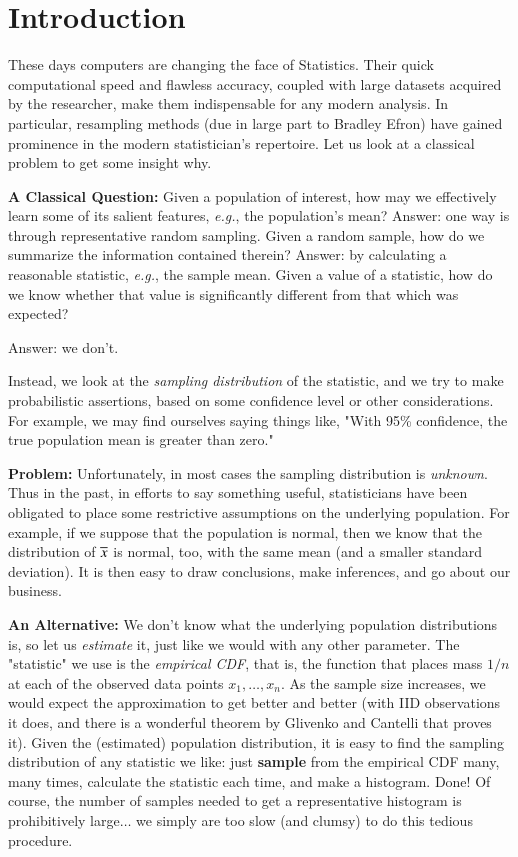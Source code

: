\documentclass[11pt,english]{scrbook}
\begin{document}
\section{Introduction}
\label{sec:orgf839db5}

These days computers are changing the face of Statistics. Their quick computational speed and flawless accuracy, coupled with large datasets acquired by the researcher, make them indispensable for any modern analysis. In particular, resampling methods (due in large part to Bradley Efron) have gained prominence in the modern statistician's repertoire. Let us look at a classical problem to get some insight
why.

\textbf{A Classical Question:} Given a population of interest, how may we effectively learn some of its salient features, \emph{e.g.}, the population's mean? Answer: one way is through representative random sampling. Given a random sample, how do we summarize the information contained therein? Answer: by calculating a reasonable statistic, \emph{e.g.}, the sample mean. Given a value of a statistic, how do we know whether that value is significantly different from that which was expected?

\begin{center}
Answer: we don't. 
\end{center}

Instead, we look at the \emph{sampling distribution} of the statistic, and we try to make probabilistic assertions, based on some confidence level or other considerations. For example, we may find ourselves saying things like, "With 95\% confidence, the true population mean is greater than zero."

\textbf{Problem:} Unfortunately, in most cases the sampling distribution is \emph{unknown}. Thus in the past, in efforts to say something useful, statisticians have been obligated to place some restrictive assumptions on the underlying population. For example, if we suppose that the population is normal, then we know that the distribution of \(\overline{x}\) is normal, too, with the same mean (and a smaller standard deviation). It is then easy to draw conclusions, make inferences, and go about our business.

\textbf{An Alternative:} We don't know what the underlying population distributions is, so let us \emph{estimate} it, just like we would with any other parameter. The "statistic" we use is the \emph{empirical CDF}, that is, the function that places mass \(1/n\) at each of the observed data points \(x_{1},\ldots,x_{n}\). As the sample size increases, we would expect the approximation to get better and better (with IID observations it does, and there is a wonderful theorem by Glivenko and Cantelli that proves it). Given the (estimated) population distribution, it is easy to find the sampling distribution of any statistic we like: just \textbf{sample} from the empirical CDF many, many times, calculate the statistic each time, and make a histogram. Done! Of course, the number of samples needed to get a representative histogram is prohibitively large\(\ldots\) we simply are too slow (and clumsy) to do this tedious procedure.
\end{document}
